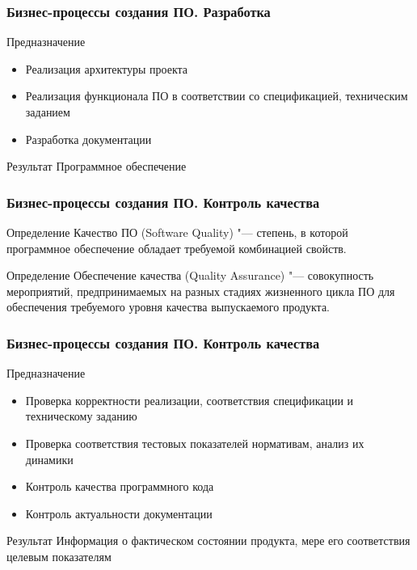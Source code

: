 \documentclass{../industrial-development}
\begin{document}
\begin{frame} \frametitle{Бизнес-процессы создания ПО. Разработка}
	\begin{block}{Предназначение}
		\begin{itemize}
			\item Реализация архитектуры проекта
			\item Реализация функционала ПО в соответствии со спецификацией, техническим заданием
			\item Разработка документации
		\end{itemize}
	\end{block}
	\begin{block}{Результат}
		Программное обеспечение
	\end{block}
\end{frame}
\lecturenotes


\begin{frame} \frametitle{Бизнес-процессы создания ПО. Контроль качества}
	\begin{block}{Определение}
		\alert{Качество ПО} (Software Quality) "--- степень, в которой программное обеспечение обладает требуемой комбинацией свойств.
	\end{block}
	\begin{block}{Определение}
		\alert{Обеспечение качества} (Quality Assurance) "--- совокупность мероприятий, предпринимаемых на разных стадиях жизненного цикла ПО для обеспечения требуемого уровня качества выпускаемого продукта.
	\end{block}
\end{frame}
\lecturenotes


\begin{frame} \frametitle{Бизнес-процессы создания ПО. Контроль качества}
	\begin{block}{Предназначение}
		\begin{itemize}
			\item Проверка корректности реализации, соответствия спецификации и техническому заданию
			\item Проверка соответствия тестовых показателей нормативам, анализ их динамики
			\item Контроль качества программного кода
			\item Контроль актуальности документации
		\end{itemize}
	\end{block}
	\begin{block}{Результат}
		Информация о фактическом состоянии продукта, мере его соответствия целевым показателям
	\end{block}
\end{frame}
\lecturenotes
\end{document}
